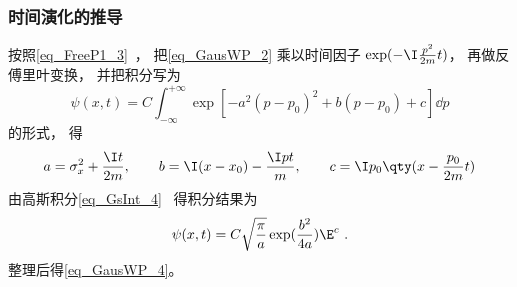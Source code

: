 \subsubsection{时间演化的推导}
按照\autoref{eq_FreeP1_3}~， 把\autoref{eq_GausWP_2} 乘以时间因子 $\exp(-\I \frac{p^2}{2m}t)$， 再做反傅里叶变换， 并把积分写为
\begin{equation}
\psi(x, t) = C\int_{-\infty}^{+\infty} \exp[-a^2(p-p_0)^2 + b(p-p_0) + c] \dd{p}
\end{equation}
的形式， 得
\begin{equation}
a = \sigma_x^2 + \frac{\I t}{2m}, \qquad
b = \I(x-x_0) - \frac{\I pt}{m}, \qquad
c = \I p_0 \qty(x - \frac{p_0}{2m} t)
\end{equation}
由高斯积分\autoref{eq_GsInt_4}~ 得积分结果为
\begin{equation}
\psi(x, t) = C\sqrt{\frac{\pi}{a}} \exp(\frac{b^2}{4a})\E^c~.
\end{equation}
整理后得\autoref{eq_GausWP_4}。
